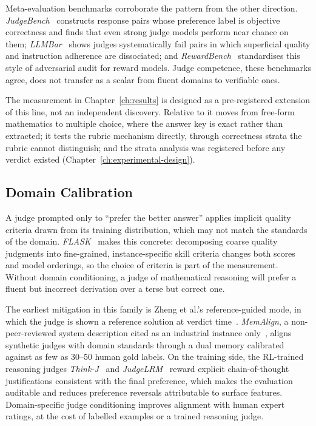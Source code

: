 Meta-evaluation benchmarks corroborate the pattern from the other
direction. \textit{JudgeBench}~\parencite{tan2025judgebench}
constructs response pairs whose preference label is objective
correctness and finds that even strong judge models perform near
chance on them; \textit{LLMBar}~\parencite{zeng2024llmbar} shows
judges systematically fail pairs in which superficial quality and
instruction adherence are dissociated; and
\textit{RewardBench}~\parencite{lambert2024rewardbench} standardises
this style of adversarial audit for reward models. Judge competence,
these benchmarks agree, does not transfer as a scalar from fluent
domains to verifiable ones.

The measurement in Chapter~\ref{ch:results} is designed as a
pre-registered extension of this line, not an independent discovery.
Relative to \textcite{stephan2024calculation} it moves from free-form
mathematics to multiple choice, where the answer key is exact rather
than extracted; it tests the rubric mechanism directly, through
correctness strata the rubric cannot distinguish; and the strata
analysis was registered before any verdict existed
(Chapter~\ref{ch:experimental-design}).

\subsection*{Domain Calibration}

A judge prompted only to ``prefer the better answer'' applies
implicit quality criteria drawn from its training distribution, which
may not match the standards of the domain.
\textit{FLASK}~\parencite{ye2024flask} makes this concrete:
decomposing coarse quality judgments into fine-grained,
instance-specific skill criteria changes both scores and model
orderings, so the choice of criteria is part of the measurement.
Without domain conditioning, a judge of mathematical reasoning will
prefer a fluent but incorrect derivation over a terse but correct
one.

The earliest mitigation in this family is Zheng et al.'s
reference-guided mode, in which the judge is shown a reference
solution at verdict time~\parencite{zheng2023judging}.
\textit{MemAlign}, a non-peer-reviewed system description cited as an
industrial instance only~\parencite{databricks2026memalign}, aligns
synthetic judges with domain standards through a dual memory
calibrated against as few as 30--50 human gold labels. On the
training side, the RL-trained reasoning judges
\textit{Think-J}~\parencite{huang2025thinkj} and
\textit{JudgeLRM}~\parencite{chen2025judgelrm} reward explicit
chain-of-thought justifications consistent with the final preference,
which makes the evaluation auditable and reduces preference reversals
attributable to surface features. Domain-specific judge conditioning
improves alignment with human expert ratings, at the cost of labelled
examples or a trained reasoning judge.

